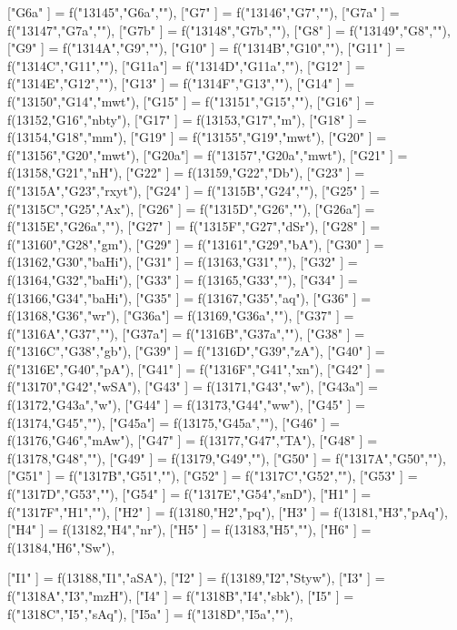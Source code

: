 {["G6a" ]       = f("13145","G6a",""),
["G7"  ]       = f("13146","G7",""),
["G7a" ]       = f("13147","G7a",""),
["G7b" ]       = f("13148","G7b",""),
["G8"  ]       = f("13149","G8",""),
["G9"  ]       = f("1314A","G9",""),
["G10" ]       = f("1314B","G10",""),
["G11" ]       = f("1314C","G11",""),
["G11a"]       = f("1314D","G11a",""),
["G12" ]       = f("1314E","G12",""),
["G13" ]       = f("1314F","G13",""),
["G14" ]       = f("13150","G14","mwt"),
["G15" ]       = f("13151","G15",""),
["G16" ]       = f(13152,"G16","nbty"),
["G17" ]       = f(13153,"G17","m"),
["G18" ]       = f(13154,"G18","mm"),
["G19" ]       = f("13155","G19","mwt"),
["G20" ]       = f("13156","G20","mwt"),
["G20a"]       = f("13157","G20a","mwt"),
["G21" ]       = f(13158,"G21","nH"),
["G22" ]       = f(13159,"G22","Db"),
["G23" ]       = f("1315A","G23","rxyt"),
["G24" ]       = f("1315B","G24",""),
["G25" ]       = f("1315C","G25","Ax"),
["G26" ]       = f("1315D","G26",""),
["G26a"]       = f("1315E","G26a",""),
["G27" ]       = f("1315F","G27","dSr"),
["G28" ]       = f("13160","G28","gm"),
["G29" ]       = f("13161","G29","bA"),
["G30" ]       = f(13162,"G30","baHi"),
["G31" ]       = f(13163,"G31",""),
["G32" ]       = f(13164,"G32","baHi"),
["G33" ]       = f(13165,"G33",""),
["G34" ]       = f(13166,"G34","baHi"),
["G35" ]       = f(13167,"G35","aq"),
["G36" ]       = f(13168,"G36","wr"),
["G36a"]       = f(13169,"G36a",""),
["G37" ]       = f("1316A","G37",""),
["G37a"]       = f("1316B","G37a",""),
["G38" ]       = f("1316C","G38","gb"),
["G39" ]       = f("1316D","G39","zA"),
["G40" ]       = f("1316E","G40","pA"),
["G41" ]       = f("1316F","G41","xn"),
["G42" ]       = f("13170","G42","wSA"),
["G43" ]       = f(13171,"G43","w"),
["G43a"]       = f(13172,"G43a","w"),
["G44" ]       = f(13173,"G44","ww"),
["G45" ]       = f(13174,"G45",""),
["G45a"]       = f(13175,"G45a",""),
["G46" ]       = f(13176,"G46","mAw"),
["G47" ]       = f(13177,"G47","TA"),
["G48" ]       = f(13178,"G48",""),
["G49" ]       = f(13179,"G49",""),
["G50" ]       = f("1317A","G50",""),
["G51" ]       = f("1317B","G51",""),
["G52" ]       = f("1317C","G52",""),
["G53" ]       = f("1317D","G53",""),
["G54" ]       = f("1317E","G54","snD"),
["H1"  ]       = f("1317F","H1",""),
["H2"  ]       = f(13180,"H2","pq"),
["H3"  ]       = f(13181,"H3","pAq"),
["H4"  ]       = f(13182,"H4","nr"),
["H5"  ]       = f(13183,"H5",""),
["H6"  ]       = f(13184,"H6","Sw"),

["I1"  ]       = f(13188,"I1","aSA"),
["I2"  ]       = f(13189,"I2","Styw"),
["I3"  ]       = f("1318A","I3","mzH"),
["I4"  ]       = f("1318B","I4","sbk"),
["I5"  ]       = f("1318C","I5","sAq"),
["I5a" ]       = f("1318D","I5a",""),

}
